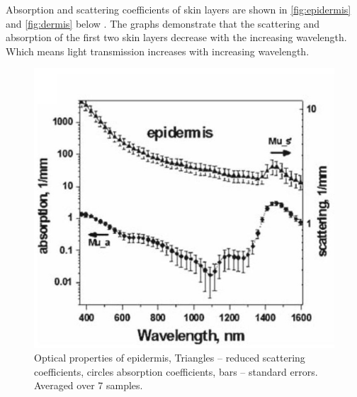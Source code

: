 Absorption and scattering coefficients of skin layers are shown in \autoref{fig:epidermis} and \autoref{fig:dermis} below \parencite{skin1}. The graphs demonstrate that the scattering and absorption of the first two skin layers decrease with the increasing wavelength. Which means light transmission increases with increasing wavelength.


\begin{figure}[H]
\centering
\includegraphics[scale=0.5]{figures/epidermis.JPG}
\caption[Optical properties of epidermis]{Optical properties of epidermis, Triangles – reduced scattering coefficients, circles absorption coefficients, bars – standard errors. Averaged over 7 samples.}\label{fig:epidermis}
\end{figure}






